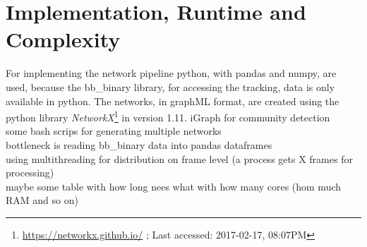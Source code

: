 \section{Implementation, Runtime and Complexity}
For implementing the network pipeline python, with pandas and numpy, are used, because the bb\_binary library, for accessing the tracking, data is only available in python. The networks, in graphML format, are created using the python library \emph{NetworkX}\footnote{\url{https://networkx.github.io/} ; Last accessed: 2017-02-17, 08:07PM} in version 1.11.
iGraph for community detection\\
some bash scrips for generating multiple networks\\

bottleneck is reading bb\_binary data into pandas dataframes\\
using multithreading for distribution on frame level (a process gets X frames for processing)\\

maybe some table with how long nees what with how many cores (hom much RAM and so on)\\